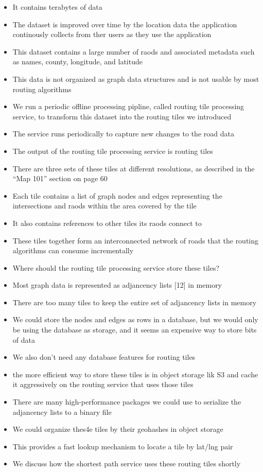 \documentclass{report}
\theoremstyle{definition}
\begin{document}
\begin{itemize}
\item
It contains terabytes of data
\item
The dataset is improved over time by the location data the application continously collects from ther users as they use the application
\item
This dataset contains a large number of raods and associated metadata such as names, county, longitude, and latitude
\item
This data is not organized as graph data structures and is not usable by most routing algorithms
\item
We run a periodic offline processing pipline, called routing tile processing service, to transform this dataset into the routing tiles we introduced
\item
The service runs periodically to capture new changes to the road data
\item
The output of the routing tile processing service is routing tiles
\item
There are three sets of these tiles at different resolutions, as described in the ``Map 101'' section on page 60
\item
Each tile contains a list of graph nodes and edges representing the intersections and raods within the area covered by the tile
\item
It also contains references to other tiles its raods connect to
\item
These tiles together form an interconnected network of roads that the routing algorithms can consume incrementally
\item
Where should the routing tile processing service store these tiles?
\item
Most graph data is represented as adjancency lists [12] in memory
\item
There are too many tiles to keep the entire set of adjancency lists in memory
\item
We could store the nodes and edges as rows in a database, but we would only be using the database as storage, and it seems an expensive way to store bits of data
\item
We also don't need any database features for routing tiles
\item
the more efficient way to store these tiles is in object storage lik S3 and cache it aggressively on the routing service that uses those tiles
\item
There are many high-performance packages we could use to serialize the adjancency lists to a binary file
\item
We could organize thes4e tiles by their geohashes in object storage
\item
This provides a fast lookup mechanism to locate a tile by lat/lng pair
\item
We discuss how the shortest path service uses these routing tiles shortly
\end{itemize}
\end{document}
